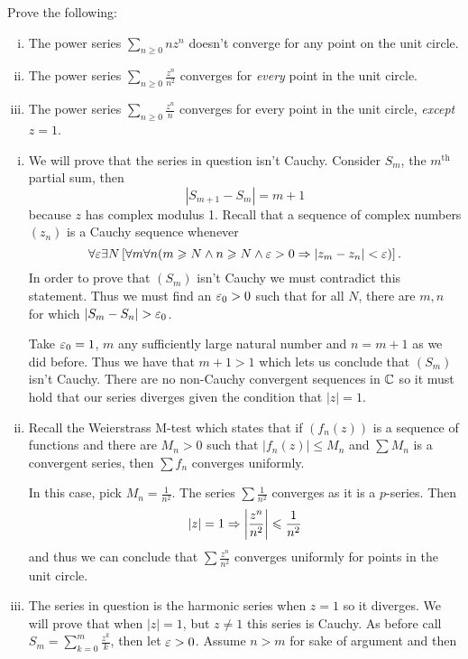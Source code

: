 \documentclass[12pt]{memoir}
\begin{document}
\begin{Ej}
    Prove the following:
    \begin{enumerate}[i)]
        \itemsep=-0.4em
        \item The power series $\sum_{n\geq 0}nz^n$ doesn't converge for any point on the unit circle.
        \item The power series $\sum_{n\geq 0}\frac{z^n}{n^2}$ converges for \emph{every} point in the unit circle.
        \item The power series $\sum_{n\geq 0}\frac{z^n}{n}$ converges for {every} point in the unit circle, \emph{except} $z=1$.
        \end{enumerate}
\end{Ej}

\begin{ptcbr}
    \begin{enumerate}[i)]
        \itemsep=-0.4em
        \item We will prove that the series in question isn't Cauchy. Consider $S_m$, the $m^{\text{th}}$ partial sum, then 
        $$|S_{m+1}-S_m|=m+1$$
        because $z$ has complex modulus 1. Recall that a sequence of complex numbers $(z_n)$ is a Cauchy sequence whenever %
        $$\forall \varepsilon \exists N\left[\forall m\forall n(m\geqslant N\land n\geqslant N\land \varepsilon>0\Rightarrow |z_m-z_n|<\varepsilon)\right].$$
        In order to prove that $(S_m)$ isn't Cauchy we must contradict this statement. Thus we must find an $\varepsilon_0>0$ such that for all $N$, there are $m,n$ for which $|S_m-S_n|>\eps_0$.\par 
        Take $\varepsilon_0=1$, $m$ any sufficiently large natural number and $n=m+1$ as we did before. Thus we have that $m+1>1$ which lets us conclude that $(S_m)$ isn't Cauchy. There are no non-Cauchy convergent sequences in $\mathbb{C}$ so it must hold that our series diverges given the condition that $|z|=1$. 
        \item Recall the Weierstrass M-test which states that if $(f_n(z))$ is a sequence of functions and there are $M_n>0$ such that $|f_n(z)|\leq M_n$ and $\sum M_n$ is a convergent series, then $\sum f_n$ converges uniformly.\par 
        In this case, pick $M_n=\frac{1}{n^2}$. The series $\sum \frac{1}{n^2}$ converges as it is a $p$-series. Then 
        $$|z|=1\Rightarrow\left|\frac{z^n}{n^2}\right|\leqslant\frac{1}{n^2}$$
        and thus we can conclude that $\sum\frac{z^n}{n^2}$ converges uniformly for points in the unit circle. 
        \item The series in question is the harmonic series when $z=1$ so it diverges. We will prove that when $|z|=1$, but $z\neq 1$ this series is Cauchy. As before call $S_m=\sum_{k=0}^m\frac{z^k}{k}$, then let $\varepsilon>0$. Assume $n>m$ for sake of argument and then

\end{enumerate}
\end{ptcbr}
\end{document}

